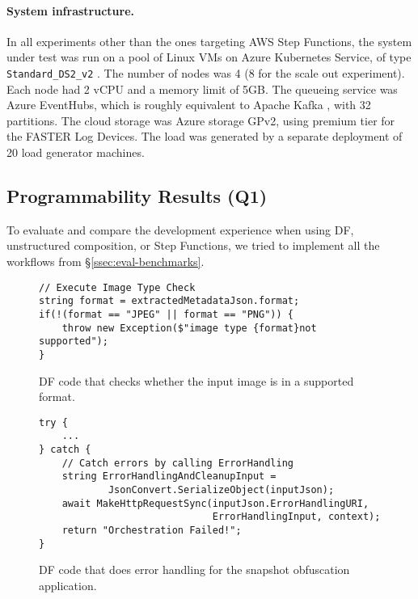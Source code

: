 \paragraph{System infrastructure.} In all experiments other than the ones targeting AWS Step Functions, the system under test was run on a pool of Linux VMs on Azure Kubernetes Service, of type \verb+Standard_DS2_v2+ \cite{azure-vm-sizes}. The number of nodes was 4 (8 for the scale out experiment). Each node had 2 vCPU and a memory limit of 5GB. The queueing service was Azure EventHubs, which is roughly equivalent to Apache Kafka \cite{kafka}, with 32 partitions. The cloud storage was Azure storage GPv2, using premium tier for the FASTER Log Devices. The load was generated by a separate deployment of 20 load generator machines.



\subsection{Programmability Results (Q1)}
\label{ssec:eval-programmability}

To evaluate and compare the development experience when using DF, unstructured composition, or Step Functions, we tried to implement all the workflows from \S\ref{ssec:eval-benchmarks}.
%
\begin{figure}[t]
\begin{verbatim}
// Execute Image Type Check
string format = extractedMetadataJson.format;
if(!(format == "JPEG" || format == "PNG")) {
    throw new Exception($"image type {format}not supported");
}
\end{verbatim}
\caption{DF code that checks whether the input image is in a supported format.}
\label{fig:df-image-rec-if}
\end{figure}
%
\begin{figure}[t]
\begin{verbatim}
try {
    ...
} catch {
    // Catch errors by calling ErrorHandling
    string ErrorHandlingAndCleanupInput = 
            JsonConvert.SerializeObject(inputJson);
    await MakeHttpRequestSync(inputJson.ErrorHandlingURI, 
                              ErrorHandlingInput, context);
    return "Orchestration Failed!";
}
\end{verbatim}
\caption{DF code that does error handling for the snapshot obfuscation application.}
\label{fig:df-maskopy-error-handling}
\end{figure}

